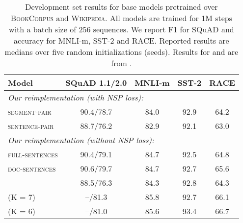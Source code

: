 \begin{table*}[t]
\begin{center}
\begin{tabular}{lcccc}
\toprule
\bf Model & \bf SQuAD 1.1/2.0 & \bf MNLI-m & \bf SST-2 & \bf RACE \\ 
\midrule
\multicolumn{5}{l}{\emph{Our reimplementation (with NSP loss):}} \\
\textsc{segment-pair} & 90.4/78.7 & 84.0 & 92.9 & 64.2 \\
\textsc{sentence-pair} & 88.7/76.2 & 82.9 & 92.1 & 63.0 \\
\midrule
\multicolumn{5}{l}{\emph{Our reimplementation (without NSP loss):}} \\
\textsc{full-sentences} & 90.4/79.1 & 84.7 & 92.5 & 64.8 \\
\textsc{doc-sentences} & 90.6/79.7 & 84.7 & 92.7 & 65.6 \\
\midrule
\bertbase{} & 88.5/76.3 & 84.3 & 92.8 & 64.3 \\
\xlnetbase{} (K = 7) & --/81.3 & 85.8 & 92.7 & 66.1 \\
\xlnetbase{} (K = 6) & --/81.0 & 85.6 & 93.4 & 66.7 \\
\bottomrule



\end{tabular}
\end{center}
\caption{
Development set results for base models pretrained over \textsc{BookCorpus} and \textsc{Wikipedia}.
All models are trained for 1M steps with a batch size of 256 sequences.
We report F1 for SQuAD and accuracy for MNLI-m, SST-2 and RACE.
Reported results are medians over five random initializations (seeds).
Results for \bertbase{} and \xlnetbase{} are from .
}
\label{tab:base_apples_to_apples}
\end{table*}